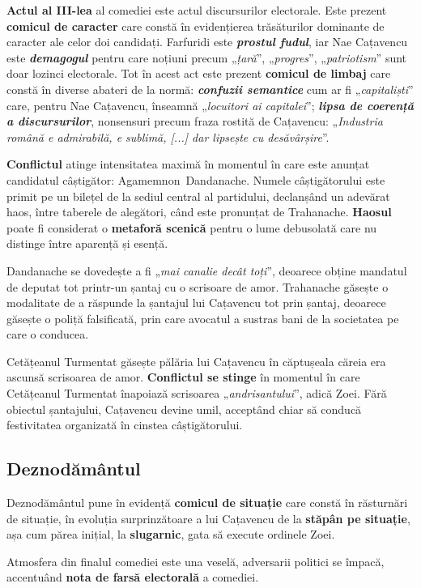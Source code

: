 \documentclass{article}
\newcommand{\qu}[1]{„\emph{#1}”}
\begin{document}
\textbf{Actul al III-lea} al comediei este actul discursurilor electorale. Este prezent \textbf{comicul de caracter} care constă în evidențierea trăsăturilor dominante de caracter ale celor doi candidați. Farfuridi este \textsl{\textbf{prostul fudul}}, iar Nae Cațavencu este \textsl{\textbf{demagogul}} pentru care noțiuni precum \qu{țară}, \qu{progres}, \qu{patriotism} sunt doar lozinci electorale. Tot în acest act este prezent \textbf{comicul de limbaj} care constă în diverse abateri de la normă: \textsl{\textbf{confuzii semantice}} cum ar fi \qu{capitaliști} care, pentru Nae Cațavencu, înseamnă \qu{locuitori ai capitalei}; \textsl{\textbf{lipsa de coerență a discursurilor}}, nonsensuri precum fraza rostită de Cațavencu: \qu{Industria română e admirabilă, e sublimă, [...] dar lipsește cu desăvârșire}.

\textbf{Conflictul} atinge intensitatea maximă în momentul în care este anunțat candidatul câștigător: \mbox{Agamemnon Dandanache}. Numele câștigătorului este primit pe un bilețel de la sediul central al partidului, declanșând un adevărat haos, între taberele de alegători, când este pronunțat de Trahanache. \textbf{Haosul} poate fi considerat o \textbf{metaforă scenică} pentru o lume debusolată care nu distinge între aparență și esență.

Dandanache se dovedește a fi \qu{mai canalie decât toți}, deoarece obține mandatul de deputat tot printr-un șantaj cu o scrisoare de amor. Trahanache găsește o modalitate de a răspunde la șantajul lui Cațavencu tot prin șantaj, deoarece găsește o poliță falsificată, prin care avocatul a sustras bani de la societatea pe care o conducea.

Cetățeanul Turmentat găsește pălăria lui Cațavencu în căptușeala căreia era ascunsă scrisoarea de amor. \textbf{Conflictul se stinge} în momentul în care Cetățeanul Turmentat înapoiază scrisoarea \qu{andrisantului}, adică Zoei. Fără obiectul șantajului, Cațavencu devine umil, acceptând chiar să conducă festivitatea organizată în cinstea câștigătorului.
\subsection{Deznodământul}
Deznodământul pune în evidență \textbf{comicul de situație} care constă în răsturnări de situație, în evoluția surprinzătoare a lui Cațavencu de la \textbf{stăpân pe situație}, așa cum părea inițial, la \textbf{slugarnic}, gata să execute ordinele Zoei.

Atmosfera din finalul comediei este una veselă, adversarii politici se împacă, accentuând \textbf{nota de farsă electorală} a comediei.
\end{document}

